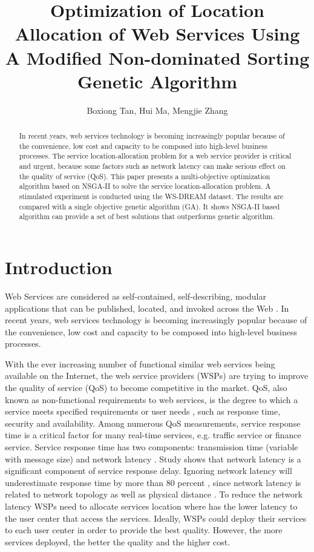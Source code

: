 \documentclass{llncs}
\title{
Optimization of Location Allocation of Web Services Using A Modified Non-dominated Sorting Genetic Algorithm
}
\author{Boxiong Tan, Hui Ma, Mengjie Zhang}
\institute{School of Engineering and Computer Science,
\\Victoria University of Wellington, New Zealand \\
\email{\{Boxiong.Tan, Hui.Ma, Mengjie.Zhang\}@ecs.vuw.ac.nz}}
\begin{document}
\maketitle

\begin{abstract}
In recent years, web services technology is becoming increasingly popular because of the convenience, 
low cost and capacity to be composed into high-level business processes. 
The service location-allocation problem for a web service provider is critical and urgent,
because some factors such as network latency can make serious effect on the quality of service (QoS). 
This paper presents a multi-objective optimization algorithm based on NSGA-II to solve the service location-allocation problem. 
A stimulated experiment is conducted using the WS-DREAM dataset. 
The results are compared with a single objective genetic algorithm (GA). 
It shows NSGA-II based algorithm can provide a set of best solutions that outperforms genetic algorithm.
\end{abstract}

\section{Introduction}
Web Services are considered as self-contained, self-describing, modular applications that can be published, located, and invoked across the Web \cite{Ran}. 
In recent years, web services technology is becoming increasingly popular because of the convenience, low cost \cite{Aboolian} and capacity to be composed into high-level business processes.

With the ever increasing number of functional similar web services being available on the Internet, the web service providers (WSPs) are trying to improve the quality of service (QoS) to become competitive in the market.  
QoS, also known as non-functional requirements to  web services, is the degree to which a service meets specified requirements or user needs \cite{4061431}, such as response time, security and availability. 
Among numerous QoS measurements, service response time is a critical factor for many real-time services, e.g. traffic service or finance service. 
Service response time has two components: transmission time (variable with message size) and network latency \cite{Johansson}. 
Study \cite{916684} shows that network latency is a significant component of service response delay.
Ignoring network latency will underestimate response time by more than 80 percent \cite{Sun}, since network latency is related to network topology as well as physical distance \cite{distanceMetrics}. 
To reduce the network latency WSPs need to allocate services location where has the lower latency to the user center that
access the services. Ideally, WSPs could deploy their services to each user center in order to provide the best quality.
However, the more services deployed, the better the quality and the higher cost. 
\end{document}
